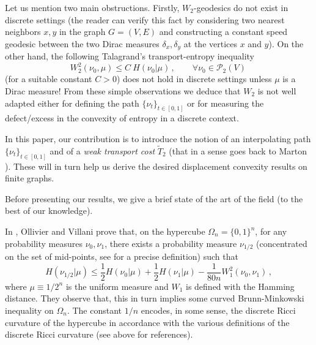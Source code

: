 \documentclass[11pt]{amsart}
\numberwithin{equation}{section}
\begin{document}
Let us mention two main obstructions. Firstly, ${W}_{2}$-geodesics do not exist in discrete settings
(the reader can  verify this fact by considering two nearest neighbors $x,y$ in the graph
$G=(V,E)$ and  constructing a constant speed geodesic between the two Dirac measures $\delta_x, \delta_y$ at the vertices $x$ and $y$).
On the other hand, the following Talagrand's transport-entropy inequality
\begin{equation} \label{tal}
W_2^2(\nu_0,\mu) \leq C\  H(\nu_0|\mu)\,, \qquad \forall \nu_0 \in \mathcal{P}_2(V)\,
\end{equation}
(for a suitable constant $C>0$) does not hold in discrete settings unless $\mu$ is a Dirac measure!
From these simple observations we deduce that ${W}_{2}$ is not well adapted either for defining the path 
$\{\nu_t\}_{t\in [0,1]}$ or for measuring the  defect/excess  in the convexity of  entropy in a discrete context.

In this paper, our contribution is to introduce the notion of an interpolating path $\{\nu_t\}_{t\in [0,1]}$ 
and of a {\em weak transport cost} $\widetilde{T}_{2}$ (that in a sense goes back to Marton \cite{marton96, marton97}
).  These will in turn help us derive the desired displacement convexity results on finite graphs.

\bigskip

Before presenting our results, we give a brief state of the art of the field (to the best of our knowledge).

In \cite{ollivier-villani}, Ollivier and Villani prove that, on the hypercube $\Omega_n=\{0,1\}^n$, 
for any probability measures $\nu_0, \nu_1$, there exists a probability measure $\nu_{1/2}$ (concentrated on the set of 
mid-points, see \cite{ollivier-villani} for a precise definition) such that
$$
H(\nu_{1/2}|\mu) \leq \frac{1}{2} H(\nu_0|\mu) + \frac{1}{2} H(\nu_1|\mu) - \frac{1}{80n} W_1^2(\nu_0,\nu_1)\,,
$$
where $\mu\equiv 1/2^n$ is the uniform measure and $W_1$ is defined with the Hamming distance. They observe that, this in turn implies some curved Brunn-Minkowski inequality on $\Omega_n$. The constant $1/n$ encodes, in some sense, the discrete Ricci curvature of the hypercube
in accordance with the various definitions of the discrete Ricci curvature (see above for references).
\end{document}
